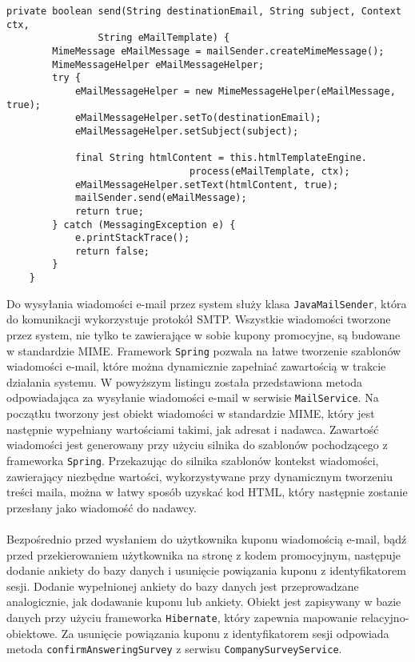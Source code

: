 \begin{center}
\begin{lstlisting}[caption={Listing kodu wysyłającego e-mail.},captionpos=b]
private boolean send(String destinationEmail, String subject, Context ctx, 
				String eMailTemplate) {
        MimeMessage eMailMessage = mailSender.createMimeMessage();
        MimeMessageHelper eMailMessageHelper;
        try {
            eMailMessageHelper = new MimeMessageHelper(eMailMessage, true);
            eMailMessageHelper.setTo(destinationEmail);
            eMailMessageHelper.setSubject(subject);

            final String htmlContent = this.htmlTemplateEngine.
            					process(eMailTemplate, ctx);
            eMailMessageHelper.setText(htmlContent, true);
            mailSender.send(eMailMessage);
            return true;
        } catch (MessagingException e) {
            e.printStackTrace();
            return false;
        }
    }
\end{lstlisting}
\end{center}


Do wysyłania wiadomości e-mail przez system służy klasa \texttt{JavaMailSender}, która do komunikacji wykorzystuje protokół SMTP. Wszystkie wiadomości tworzone przez system, nie tylko te zawierające w sobie kupony promocyjne, są budowane w standardzie MIME. Framework \texttt{Spring} pozwala na łatwe tworzenie szablonów wiadomości e-mail, które można dynamicznie zapełniać zawartością w trakcie działania systemu. W powyższym listingu została przedstawiona metoda odpowiadająca za wysyłanie wiadomości e-mail w serwisie \texttt{MailService}. Na początku tworzony jest obiekt wiadomości w standardzie MIME, który jest następnie wypełniany wartościami takimi, jak adresat i nadawca. Zawartość wiadomości jest generowany przy użyciu silnika do szablonów pochodzącego z frameworka \texttt{Spring}. Przekazując do silnika szablonów kontekst wiadomości, zawierający niezbędne wartości, wykorzystywane przy dynamicznym tworzeniu treści maila, można w łatwy sposób uzyskać kod HTML, który następnie zostanie przesłany jako wiadomość do nadawcy.

\paragraph{}
Bezpośrednio przed wysłaniem do użytkownika kuponu wiadomością e-mail, bądź przed przekierowaniem użytkownika na stronę z kodem promocyjnym, następuje dodanie ankiety do bazy danych i usunięcie powiązania kuponu z identyfikatorem sesji. Dodanie wypełnionej ankiety do bazy danych jest przeprowadzane analogicznie, jak dodawanie kuponu lub ankiety. Obiekt jest zapisywany w bazie danych przy użyciu frameworka \texttt{Hibernate}, który zapewnia mapowanie relacyjno-obiektowe. Za usunięcie powiązania kuponu z identyfikatorem sesji odpowiada metoda \texttt{confirmAnsweringSurvey} z serwisu \texttt{CompanySurveyService}.
\clearpage

